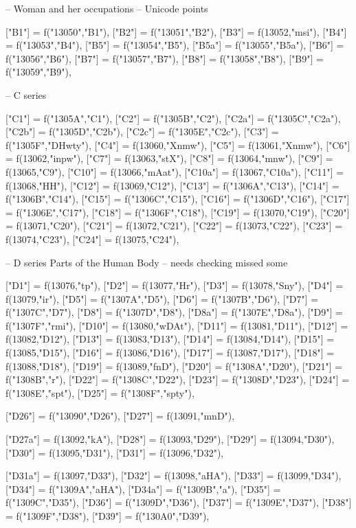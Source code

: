 \documentclass{article}
\begin{document}
\begin{luacode*}
{-- Woman and her occupations
-- Unicode points 

	["B1"] 		= f("13050","B1"),
	["B2"] 		= f("13051","B2"),
	["B3"] 		= f(13052,"msi"),
	["B4"] 		= f("13053","B4"),
	["B5"] 		= f("13054","B5"),
	["B5a"]		= f("13055","B5a"),
	["B6"] 		= f("13056","B6"),
	["B7"] 		= f("13057","B7"),
	["B8"] 		= f("13058","B8"),
	["B9"] 		= f("13059","B9"),

-- C series

	["C1"] 		= f("1305A","C1"),
	["C2"] 		= f("1305B","C2"),
	["C2a"] 		= f("1305C","C2a"),
	["C2b"] 		= f("1305D","C2b"),
	["C2c"] 		= f("1305E","C2c"),
	["C3"] 		= f("1305F","DHwty"),
	["C4"] 		= f(13060,"Xnmw"),
	["C5"] 		= f(13061,"Xnmw"),
	["C6"] 		= f(13062,"inpw"),
	["C7"] 		= f(13063,"stX"),
	["C8"] 		= f(13064,"mnw"),
   ["C9"]  		= f(13065,"C9"),  
	["C10"] 		= f(13066,"mAat"),
	["C10a"] 		= f(13067,"C10a"),
	["C11"] 		= f(13068,"HH"),
	["C12"] 		= f(13069,"C12"),
	["C13"] 		= f("1306A","C13"),
	["C14"] 		= f("1306B","C14"),
	["C15"] 		= f("1306C","C15"),
	["C16"] 		= f("1306D","C16"),
	["C17"] 		= f("1306E","C17"),
	["C18"] 		= f("1306F","C18"),
	["C19"] 		= f(13070,"C19"),
	["C20"] 		= f(13071,"C20"),
	["C21"] 		= f(13072,"C21"),
	["C22"] 		= f(13073,"C22"),
	["C23"] 		= f(13074,"C23"),
	["C24"] 		= f(13075,"C24"),

-- D series Parts of the Human Body
-- needs checking missed some

	["D1"]  		= f(13076,"tp"),
	["D2"]  		= f(13077,"Hr"),
	["D3"] 		= f(13078,"Sny"),
	["D4"]  		= f(13079,"ir"),
	["D5"]  		= f("1307A","D5"),
	["D6"]  		= f("1307B","D6"),
	["D7"]  		= f("1307C","D7"),
	["D8"] 		= f("1307D","D8"),
	["D8a"]		= f("1307E","D8a"),
	["D9"]  		= f("1307F","rmi"),
	["D10"] 		= f(13080,"wDAt"),
	["D11"] 		= f(13081,"D11"),
	["D12"] 		= f(13082,"D12"),
	["D13"] 		= f(13083,"D13"),
	["D14"] 		= f(13084,"D14"),
	["D15"] 		= f(13085,"D15"),
	["D16"] 		= f(13086,"D16"),
	["D17"] 		= f(13087,"D17"),
	["D18"] 		= f(13088,"D18"),
	["D19"] 		= f(13089,"fnD"),
	["D20"] 		= f("1308A","D20"),
	["D21"] 		= f("1308B","r"),
	["D22"] 		= f("1308C","D22"),
	["D23"] 		= f("1308D","D23"),
	["D24"] 		= f("1308E","spt"),
	["D25"] 		= f("1308F","spty"),

	["D26"] 		= f("13090","D26"),
	["D27"] 		= f(13091,"mnD"),

	["D27a"] 		= f(13092,"kA"),
	["D28"] 		= f(13093,"D29"),
	["D29"] 		= f(13094,"D30"),
	["D30"] 		= f(13095,"D31"),
	["D31"] 		= f(13096,"D32"),
  
	["D31a"] 		= f(13097,"D33"),
	["D32"] 		= f(13098,"aHA"),
	["D33"] 		= f(13099,"D34"),
	["D34"] 		= f("1309A","aHA"),
	["D34a"] 		= f("1309B","a"),
	["D35"] 		= f("1309C","D35"),
	["D36"] 		= f("1309D","D36"),
	["D37"] 		= f("1309E","D37"),
	["D38"] 		= f("1309F","D38"),
	["D39"] 		= f("130A0","D39"),

}
\end{luacode*}
\end{document}
